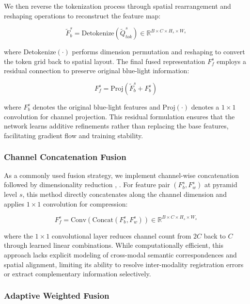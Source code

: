 We then reverse the tokenization process through spatial rearrangement and reshaping operations to reconstruct the feature map:

\begin{equation}
\widetilde{F}_b^s = \text{Detokenize}(\widetilde{Q}^s_{tok}) \in \mathbb{R}^{B \times C \times H_s \times W_s}
\end{equation}

where $\text{Detokenize}(\cdot)$ performs dimension permutation and reshaping to convert the token grid back to spatial layout. The final fused representation $F_{f}^s$ employs a residual connection to preserve original blue-light information:

\begin{equation}
F_{f}^s = \text{Proj}(\widetilde{F}_b^s + F_b^s)
\end{equation}

where $F_b^s$ denotes the original blue-light features and $\text{Proj}(\cdot)$ denotes a $1 \times 1$ convolution for channel projection. This residual formulation ensures that the network learns additive refinements rather than replacing the base features, facilitating gradient flow and training stability.

\subsubsection{Channel Concatenation Fusion}

As a commonly used fusion strategy, we implement channel-wise concatenation followed by dimensionality reduction \cite{concat_1}, \cite{concat_2}. For feature pair $(F_b^s, F_w^s)$ at pyramid level $s$, this method directly concatenates along the channel dimension and applies $1 \times 1$ convolution for compression:

\begin{equation}
F_{f}^s = \text{Conv}(\text{Concat}(F_b^s, F_w^s)) \in \mathbb{R}^{B \times C \times H_s \times W_s}
\end{equation}

where the $1 \times 1$ convolutional layer reduces channel count from $2C$ back to $C$ through learned linear combinations. While computationally efficient, this approach lacks explicit modeling of cross-modal semantic correspondences and spatial alignment, limiting its ability to resolve inter-modality registration errors or extract complementary information selectively.

\subsubsection{Adaptive Weighted Fusion}

